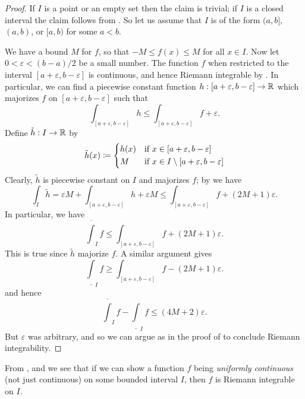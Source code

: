 \begin{proof}
  If \(I\) is a point or an empty set then the claim is trivial;
  if \(I\) is a closed interval the claim follows from .
  So let us assume that \(I\) is of the form \((a, b]\), \((a, b)\), or \([a, b)\) for some \(a < b\).

  We have a bound \(M\) for \(f\), so that \(-M \leq f(x) \leq M\) for all \(x \in I\).
  Now let \(0 < \varepsilon < (b - a) / 2\) be a small number.
  The function \(f\) when restricted to the interval \([a + \varepsilon, b - \varepsilon]\) is continuous, and hence Riemann integrable by .
  In particular, we can find a piecewise constant function \(h : [a + \varepsilon, b - \varepsilon] \to \mathbb{R}\) which majorizes \(f\) on \([a + \varepsilon, b - \varepsilon]\) such that
  \[
    \int_{[a + \varepsilon, b - \varepsilon]} h \leq \int_{[a + \varepsilon, b - \varepsilon]} f + \varepsilon.
  \]
  Define \(\tilde{h} : I \to \mathbb{R}\) by
  \[
    \tilde{h}(x) \coloneqq \begin{dcases}
      h(x) & \text{if } x \in [a + \varepsilon, b - \varepsilon]             \\
      M    & \text{if } x \in I \setminus [a + \varepsilon, b - \varepsilon]
    \end{dcases}
  \]
  Clearly, \(\tilde{h}\) is piecewise constant on \(I\) and majorizes \(f\);
  by  we have
  \[
    \int_I \tilde{h} = \varepsilon M + \int_{[a + \varepsilon, b - \varepsilon]} h + \varepsilon M \leq \int_{[a + \varepsilon, b - \varepsilon]} f + (2M + 1) \varepsilon.
  \]
  In particular, we have
  \[
    \overline{\int}_I f \leq \int_{[a + \varepsilon, b - \varepsilon]} f + (2M + 1) \varepsilon.
  \]
  This is true since \(\tilde{h}\) majorize \(f\).
  A similar argument gives
  \[
    \underline{\int}_I f \geq \int_{[a + \varepsilon, b - \varepsilon]} f - (2M + 1) \varepsilon.
  \]
  and hence
  \[
    \overline{\int}_I f - \underline{\int}_I f \leq (4M + 2) \varepsilon.
  \]
  But \(\varepsilon\) was arbitrary, and so we can argue as in the proof of  to conclude Riemann integrability.
\end{proof}

\begin{note}
  From ,  and  we see that if we can show a function \(f\) being \emph{uniformly continuous} (not just continuous) on some bounded interval \(I\), then \(f\) is Riemann integrable on \(I\).
\end{note}

